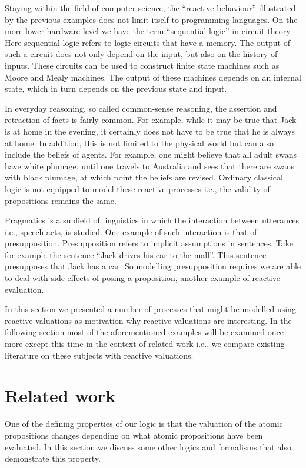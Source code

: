 \documentclass[a4paper,twoside,openright]{report}
\begin{document}
Staying within the field of computer science, the ``reactive behaviour'' illustrated by the previous examples does not limit itself to programming languages. On the more lower hardware level we have the term ``sequential logic'' in circuit theory. Here sequential logic refers to logic circuits that have a memory. The output of such a circuit does not only depend on the input, but also on the history of inputs. These circuits can be used to construct finite state machines such as Moore and Mealy machines. The output of these machines depends on an internal state, which in turn depends on the previous state and input. 

In everyday reasoning, so called common-sense reasoning, the assertion and retraction of facts is fairly common. For example, while it may be true that Jack is at home in the evening, it certainly does not have to be true that he is always at home. In addition, this is not limited to the physical world but can also include the beliefs of agents. For example, one might believe that all adult swans have white plumage, until one travels to Australia and sees that there are swans with black plumage, at which point the beliefs are revised. Ordinary classical logic is not equipped to model these reactive processes i.e., the validity of propositions remains the same.

Pragmatics is a subfield of linguistics in which the interaction between utterances i.e., speech acts, is studied. One example of such interaction is that of presupposition. Presupposition refers to implicit assumptions in sentences. Take for example the sentence ``Jack drives his car to the mall''. This sentence presupposes that Jack has a car. So modelling presupposition requires we are able to deal with side-effects of posing a proposition, another example of reactive evaluation. 

In this section we presented a number of processes that might be modelled using reactive valuations as motivation why reactive valuations are interesting. In the following section most of the aforementioned examples will be examined once more except this time in the context of related work i.e., we compare existing literature on these subjects with reactive valuations.

\section{Related work}
One of the defining properties of our logic is that the valuation of the atomic propositions changes depending on what atomic propositions have been evaluated. In this section we discuss some other logics and formalisms that also demonstrate this property.
\end{document}
